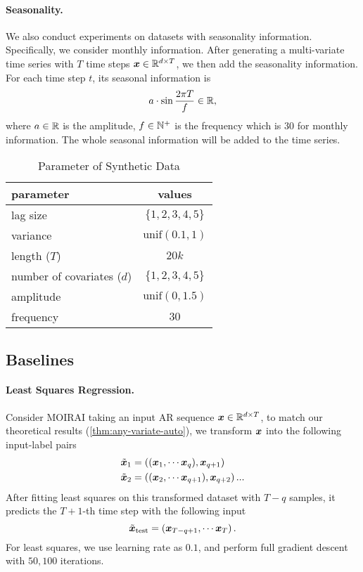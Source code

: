 \paragraph{Seasonality.}
We also conduct experiments on datasets with seasonality information.
Specifically, we consider monthly information.
After generating a multi-variate time series with $T$ time steps $\bm{x} \in \mathbb{R}^{d \times T}$, we then add the seasonality information.
For each time step $t$, its seasonal information is
\[
a \cdot \sin{ \frac{2 \pi T}{f}} \in \mathbb{R},
\]
where $a \in \mathbb{R}$ is the amplitude, $f \in \mathbb{N}^+$ is the frequency which is $30$ for monthly information.
The whole seasonal information will be added to the time series.

\begin{table}[h]
        \centering
        \caption{Parameter of Synthetic Data
        }
        \begin{tabular}{l*{1}{c}}
        \toprule
            \bf{parameter} & \multicolumn{1}{c}{\bf{values}}  \\ 
            \midrule
            lag size & $\{ 1, 2, 3, 4, 5 \}$ \\ 
            variance
            &  $\text{unif}(0.1, 1)$ \\
            length ($T$)
            & $20k$ \\
            number of covariates ($d$)
            & $\{1, 2, 3, 4, 5 \}$ \\
            \midrule
            amplitude &  $\text{unif}(0, 1.5)$ \\
            frequency &  $30$ \\
            \bottomrule
        \end{tabular}
    \label{table:data-param}
\end{table} 


\subsection{Baselines}

\paragraph{Least Squares Regression.}\label{appendix:ls-baseline}
Consider MOIRAI taking an input AR sequence $\bm{x} \in \mathbb{R}^{d \times T}$, to match our theoretical results (\cref{thm:any-variate-auto}), we transform $\bm{x}$ into the following input-label pairs
\begin{align*}
    \tilde{\bm{x}}_1 &= 
    \left(
    ( \bm{x}_1, \cdots \bm{x}_q ),
    \bm{x}_{q+1}
    \right)
    \\
    \tilde{\bm{x}}_2 &= 
    \left(
    ( \bm{x}_2, \cdots \bm{x}_{q+1} ),
    \bm{x}_{q+2}
    \right)...
\end{align*}
After fitting least squares on this transformed dataset with $T-q$ samples, it predicts the $T+1$-th time step with the following input
\[
\tilde{\bm{x}}_{\text{test}} = 
\left(
\bm{x}_{T-q+1}, \cdots \bm{x}_{T}
\right).
\]
For least squares, we use learning rate as $0.1$, and perform full gradient descent with $50, 100$ iterations.

